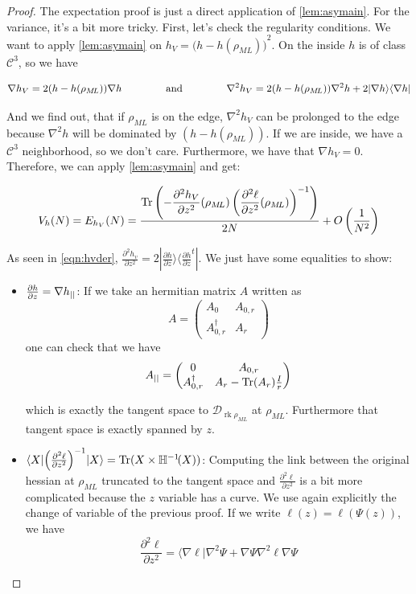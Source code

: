 \documentclass[10pt,a4paper]{report}
\theoremstyle{plain}
\theoremstyle{definition}
\theoremstyle{remark}
\newcommand{\ket}[1]{|#1\rangle}
\newcommand{\bra}[1]{\langle#1|}
\newcommand{\dpar}[2]{\frac{\partial{#1}}{\partial{#2}}}
\newcommand{\dparn}[3]{\frac{\partial^{#3} {#1}}{\partial{#2}^{#3}}}
\newcommand{\mat}[1]{\begin{pmatrix}#1\end{pmatrix}}
\DeclareMathOperator{\Tr}{Tr}
\DeclareMathOperator{\rk}{rk}
\newcommand{\class}[1]{{\mathscr{C}^{#1}}}
\newcommand{\ml}{_{M\!L}}
\newcommand{\gap}{\hspace{1.5cm}}
\begin{document}
\begin{proof}
  The expectation proof is just a direct application of \cref{lem:asymain}. For
  the variance, it's a bit more tricky. First, let's check the regularity
  conditions. We want to apply \cref{lem:asymain} on $h_V = {\big(h - h(\rho\ml)\big)}^2$.
  On the inside $h$ is of class $\class 3$, so we have

  \begin{equation}\label{eqn:hvder}
  \nabla h_V = 2 (h - h(\rho\ml)) \nabla h \gap \text{and}\gap \nabla^2 h_V =
    2(h-h(\rho\ml)) \nabla^2 h
    + 2 \ket {\nabla h} \bra {\nabla h}
\end{equation}

  And we find out, that if $\rho\ml$ is on the edge,
  $\nabla^2 h_V$ can be prolonged to the edge because $\nabla^2 h$
  will be dominated by $(h - h(\rho\ml))$. If we are inside, we have a $\class 3$
  neighborhood, so we don't care. Furthermore, we have that $\nabla h_V = 0$.
  Therefore, we can apply \cref{lem:asymain} and get:

  \[V_h(N) = E_{h_V}(N) =
    \frac{\displaystyle \Tr \left( - \dparn {h_V} z 2 (\rho\ml)
        \left( \dparn \ell z 2(\rho\ml)\right)\inv\right)}
    {2N}
    + O\left(\frac 1 {N^2}\right)\]

  As seen in \cref{eqn:hvder}, $\dparn {h_v} z 2 = 2 \ket {\dpar h z} \bra{\dpar h z^t}$. We
  just have some equalities to show:

  \begin{itemize}
  \item $\dpar h z = \nabla h\pr$: If we take an hermitian matrix $A$ written as
    \[A = \mat{A_0& A_{0,r}\\A_{0,r}^\dagger & A_r}\]
    one can check that we have
    \[ A\pr = \mat{0&A_{0,r}\\A_{0,r}^\dagger & A_r - \Tr(A_r)\frac Ir}\]

    which is exactly the tangent space to $\mathcal{D}_{\rk \rho\ml}$ at $\rho\ml$. Furthermore
    that tangent space is exactly spanned by $z$.

    \item $\bra X {\left (\dparn \ell z 2\right)}^{-1}
      \ket X = \Tr(X\times \mathbb H\inv\!(X))$: Computing the link between the
      original hessian at $\rho\ml$ truncated to the tangent space and $\dparn
      \ell z 2$ is a bit more complicated because the $z$ variable has a curve. We
      use again explicitly the change of variable of the previous proof. If
      we write $\ell(z) = \ell(\Psi(z))$, we have
      \[ \dparn \ell z 2 = \bra{ \nabla \ell} \nabla^2 \Psi + \nabla \Psi
        \nabla^2 \ell \nabla \Psi\]


\end{itemize}
\end{proof}
\end{document}
